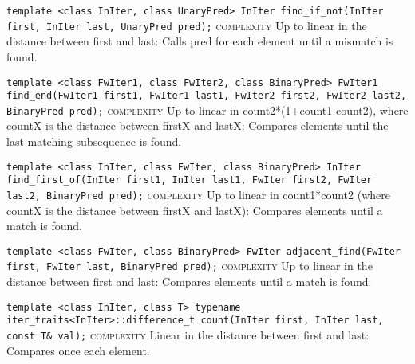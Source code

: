 \noindent{}\hspace*{0.25em}\lstinline[basicstyle=\ttfamily\color{corange}]{template <class InIter, class UnaryPred> InIter find_if_not(InIter first, InIter last, UnaryPred pred);} \textsc{complexity} Up to linear in the distance between first and last: Calls pred for each element until a mismatch is found.\\\vspace{-0.6em}

\noindent{}\hspace*{0.25em}\lstinline[basicstyle=\ttfamily\color{corange}]{template <class FwIter1, class FwIter2, class BinaryPred> FwIter1 find_end(FwIter1 first1, FwIter1 last1, FwIter2 first2, FwIter2 last2, BinaryPred pred);} \textsc{complexity} Up to linear in count2*(1+count1-count2), where countX is the distance between firstX and lastX: Compares elements until the last matching subsequence is found.\\\vspace{-0.6em}

\noindent{}\hspace*{0.25em}\lstinline[basicstyle=\ttfamily\color{corange}]{template <class InIter, class FwIter, class BinaryPred> InIter find_first_of(InIter first1, InIter last1, FwIter first2, FwIter last2, BinaryPred pred);} \textsc{complexity} Up to linear in count1*count2 (where countX is the distance between firstX and lastX): Compares elements until a match is found.\\\vspace{-0.6em}

\noindent{}\hspace*{0.25em}\lstinline[basicstyle=\ttfamily\color{corange}]{template <class FwIter, class BinaryPred> FwIter adjacent_find(FwIter first, FwIter last, BinaryPred pred);} \textsc{complexity} Up to linear in the distance between first and last: Compares elements until a match is found.\\\vspace{-0.6em}

\noindent{}\hspace*{0.25em}\lstinline[basicstyle=\ttfamily\color{corange}]{template <class InIter, class T> typename iter_traits<InIter>::difference_t count(InIter first, InIter last, const T& val);} \textsc{complexity} Linear in the distance between first and last: Compares once each element.\\\vspace{-0.6em}

